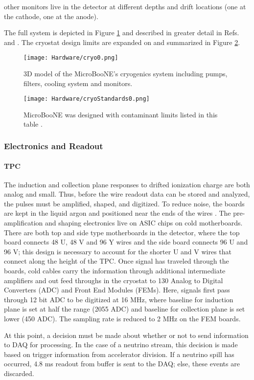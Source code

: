  other monitors live in the detector at different depths and drift locations (one at the cathode, one at the anode). 
\par The full system is depicted in Figure \ref{fig:cryo0} and described in greater detail in Refs. \cite{bib:purity} and \cite{bib:purity2}. The cryostat design limits are expanded on and summarized in Figure \ref{fig:cryo1}.

\begin{figure}[h!]
\centering
\texttt{[image: Hardware/cryo0.png]}
\caption{ 3D model of the MicroBooNE's cryogenics system including pumps, filters, cooling system and monitors.  } 
\label{fig:cryo0}
\end{figure}
  

\begin{figure}[h!]
\centering
\texttt{[image: Hardware/cryoStandards0.png]}
\caption{ MicroBooNE was designed with contaminant limits listed in this table \cite{bib:uboone_JINST}. }
\label{fig:cryo1}
\end{figure}

\subsubsection{Electronics and Readout}
\paragraph{TPC}
The induction and collection plane responses to drifted ionization charge are both analog and small.  Thus, before the wire readout data can be stored and analyzed, the pulses must be amplified, shaped, and digitized.  To reduce noise, the boards are kept in the liquid argon and positioned near the ends of the wires \cite{bib:uboone_JINST}. The pre-amplification and shaping electronics live on ASIC chips on cold motherboards. There are both top and side type motherboards in the detector, where the top board connects 48 U, 48 V and 96 Y wires and the side board connects 96 U and 96 V; this design is necessary to account for the shorter U and V wires that connect along the height of the TPC. Once signal has traveled through the boards, cold cables carry the information through additional intermediate amplifiers and out feed throughs in the cryostat to 130 Analog to Digital Converters (ADC) and Front End Modules (FEMs). Here, signals first pass through 12 bit ADC to be digitized at 16 MHz, where baseline for induction plane is set at half the range (2055 ADC) and baseline for collection plane is set lower (450 ADC). The sampling rate is reduced to 2 MHz on the FEM boards.
\par At this point, a decision must be made about whether or not to send information to DAQ for processing. In the case of a neutrino stream, this decision is made based on trigger information from accelerator division. If a neutrino spill has occurred, 4.8 ms readout from buffer is sent to the DAQ; else, these events are discarded. 
